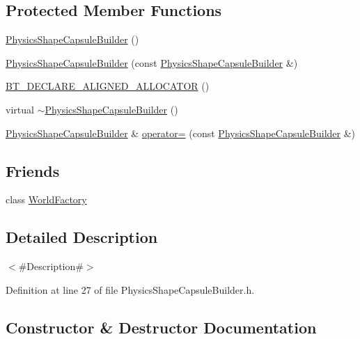 \subsection*{Protected Member Functions}
\begin{DoxyCompactItemize}
\item 
\mbox{\hyperlink{classnjli_1_1_physics_shape_capsule_builder_aeae40b9de6a3a4630b4f23b9b114d493}{Physics\+Shape\+Capsule\+Builder}} ()
\item 
\mbox{\hyperlink{classnjli_1_1_physics_shape_capsule_builder_a9829b03b427a586ca796e915ccd55172}{Physics\+Shape\+Capsule\+Builder}} (const \mbox{\hyperlink{classnjli_1_1_physics_shape_capsule_builder}{Physics\+Shape\+Capsule\+Builder}} \&)
\item 
\mbox{\hyperlink{classnjli_1_1_physics_shape_capsule_builder_a168171c081b41c47c831398a75902743}{B\+T\+\_\+\+D\+E\+C\+L\+A\+R\+E\+\_\+\+A\+L\+I\+G\+N\+E\+D\+\_\+\+A\+L\+L\+O\+C\+A\+T\+OR}} ()
\item 
virtual \mbox{\hyperlink{classnjli_1_1_physics_shape_capsule_builder_af0f9f667e26bc79907fbbf7f2682eebf}{$\sim$\+Physics\+Shape\+Capsule\+Builder}} ()
\item 
\mbox{\hyperlink{classnjli_1_1_physics_shape_capsule_builder}{Physics\+Shape\+Capsule\+Builder}} \& \mbox{\hyperlink{classnjli_1_1_physics_shape_capsule_builder_a02d75bb339253e9aa94acc9ae4229bef}{operator=}} (const \mbox{\hyperlink{classnjli_1_1_physics_shape_capsule_builder}{Physics\+Shape\+Capsule\+Builder}} \&)
\end{DoxyCompactItemize}
\subsection*{Friends}
\begin{DoxyCompactItemize}
\item 
class \mbox{\hyperlink{classnjli_1_1_physics_shape_capsule_builder_acb96ebb09abe8f2a37a915a842babfac}{World\+Factory}}
\end{DoxyCompactItemize}


\subsection{Detailed Description}
$<$\#\+Description\#$>$ 

Definition at line 27 of file Physics\+Shape\+Capsule\+Builder.\+h.



\subsection{Constructor \& Destructor Documentation}
\mbox{\label{classnjli_1_1_physics_shape_capsule_builder_aeae40b9de6a3a4630b4f23b9b114d493}} 
